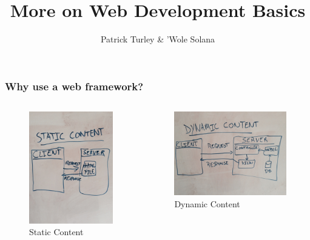 \documentclass[10pt,t,xcolor=dvipsnames]{beamer}
\title{ More on Web Development Basics }
\author{ Patrick Turley \& 'Wole Solana }
\begin{document}
\nocite*{}
\frame [c, plain]{\titlepage}
\begin{frame}[fragile]
\frametitle{Why use a web framework?}
\pause
\begin{columns}[l]
\begin{figure}
\includegraphics[scale=0.05]{../images/static.jpg}
\caption{Static Content}
\end{figure}
\pause
{}
\begin{figure}
\includegraphics[scale=0.05]{../images/dynamic.jpg}
\caption{Dynamic Content}
\end{figure}
\end{columns}
\end{frame}
\end{document}

